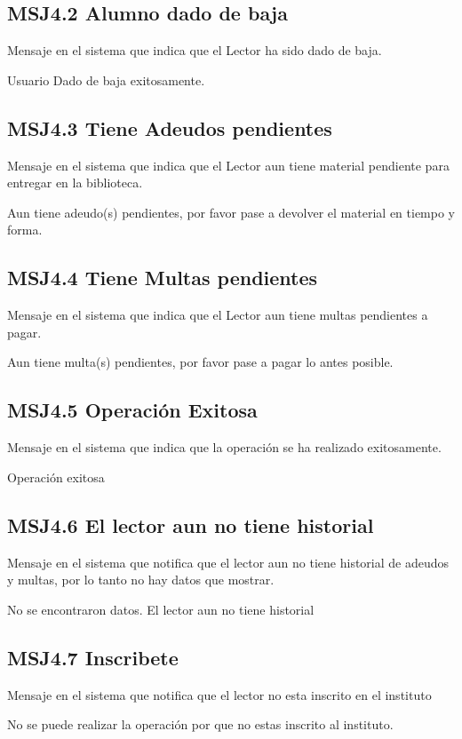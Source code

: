  \subsection{MSJ4.2 Alumno dado de baja }

Mensaje en el sistema que indica que el Lector ha sido dado de baja.

  \noindent Usuario Dado de baja exitosamente.
  
  \subsection{MSJ4.3 Tiene Adeudos pendientes }

Mensaje en el sistema que indica que el Lector aun tiene material pendiente para entregar en la biblioteca.

  \noindent Aun tiene adeudo(s) pendientes, por favor pase a devolver el material en tiempo y forma. 

  \subsection{MSJ4.4 Tiene Multas pendientes }

Mensaje en el sistema que indica que el Lector aun tiene multas pendientes a pagar.

  \noindent Aun tiene multa(s) pendientes, por favor pase a pagar lo antes posible.
  
    \subsection{MSJ4.5 Operación Exitosa }

Mensaje en el sistema que indica que la operación se ha realizado exitosamente.

  \noindent Operación exitosa
  
      \subsection{MSJ4.6 El lector aun no tiene historial }

Mensaje en el sistema que notifica que el lector aun no tiene historial de adeudos y multas, por lo tanto no hay datos que mostrar.

  \noindent No se encontraron datos. El lector aun no tiene historial
  
  \subsection{MSJ4.7 Inscribete}

Mensaje en el sistema que notifica que el lector no esta inscrito en el instituto

  \noindent No se puede realizar la operación por que no estas inscrito al instituto.




